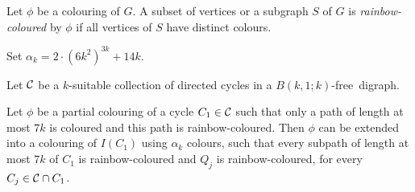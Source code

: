 \documentclass{endm}
\begin{document}
Let $\phi$ be a colouring of $G$. A subset of vertices or a subgraph $S$ of $G$ is {\it rainbow-coloured} by $\phi$ if all vertices of $S$ have distinct colours.



Set $\alpha_k=2\cdot (6k^2)^{3k} + 14k$.

\begin{lemma}\label{lem:IC}
Let ${\cal C}$ be a $k$-suitable collection of directed cycles in a $B(k,1;k)$-free\ digraph.

Let $\phi$ be a partial colouring of a cycle $C_1\in {\cal C}$ such that only a path of length at most
$7k$ is coloured and this path is rainbow-coloured. Then $\phi$ can be extended into
a colouring of $I(C_1)$ using $\alpha_k$ colours, such that every subpath of length at most $7k$ of $C_1$ is rainbow-coloured and  $Q_j$ is rainbow-coloured, for every $C_j\in {\cal C}\cap C_1$.\end{lemma}
\end{document}
